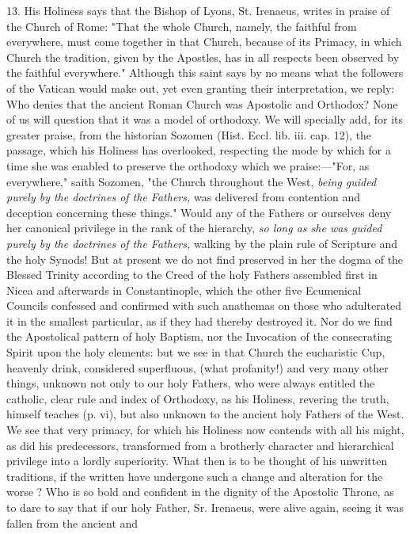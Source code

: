 13. His Holiness says that the Bishop of Lyons, St. Irenaeus, writes in
praise of the Church of Rome: "That the whole Church, namely, the
faithful from everywhere, must come together in that Church, because of
its Primacy, in which Church the tradition, given by the Apostles, has
in all respects been observed by the faithful everywhere." Although this
saint says by no means what the followers of the Vatican would make out,
yet even granting their interpretation, we reply: Who denies that the
ancient Roman Church was Apostolic and Orthodox? None of us will
question that it was a model of orthodoxy. We will specially add, for
its greater praise, from the historian Sozomen (Hist. Eccl. lib. iii.
cap. 12), the passage, which his Holiness has overlooked, respecting the
mode by which for a time she was enabled to preserve the orthodoxy which
we praise:---"For, as everywhere," saith Sozomen, "the Church throughout
the West, \emph{being guided purely by the doctrines of the Fathers,}
was delivered from contention and deception concerning these things."
Would any of the Fathers or ourselves deny her canonical privilege in
the rank of the hierarchy, \emph{so long as she was guided purely by the
doctrines of the Fathers,} walking by the plain rule of Scripture and
the holy Synods! But at present we do not find preserved in her the
dogma of the Blessed Trinity according to the Creed of the holy Fathers
assembled first in Nicea and afterwards in Constantinople, which the
other five Ecumenical Councils confessed and confirmed with such
anathemas on those who adulterated it in the smallest particular, as if
they had thereby destroyed it. Nor do we find the Apostolical pattern of
holy Baptism, nor the Invocation of the consecrating Spirit upon the
holy elements: but we see in that Church the eucharistic Cup, heavenly
drink, considered superfluous, (what profanity!) and very many other
things, unknown not only to our holy Fathers, who were always entitled
the catholic, clear rule and index of Orthodoxy, as his Holiness,
revering the truth, himself teaches (p. vi), but also unknown to the
ancient holy Fathers of the West. We see that very primacy, for which
his Holiness now contends with all his might, as did his predecessors,
transformed from a brotherly character and hierarchical privilege into a
lordly superiority. What then is to be thought of his unwritten
traditions, if the written have undergone such a change and alteration
for the worse ? Who is so bold and confident in the dignity of the
Apostolic Throne, as to dare to say that if our holy Father, Sr.
Irenaeus, were alive again, seeing it was fallen from the ancient and
